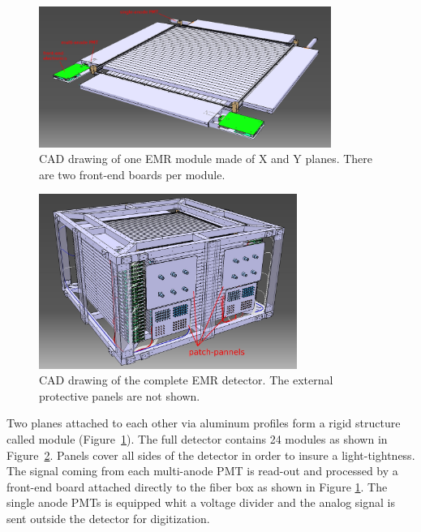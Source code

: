 \documentclass[a4paper,11pt]{article}
\begin{document}
\begin{figure}[htb]
 \centering
 \includegraphics[width=0.85\textwidth]{./emr_module}
 \caption[CAD drawing of one EMR module]{CAD drawing of one EMR module made of X and Y planes. There are two front-end boards per module.}
 \label{fig:emr_module}
\end{figure}
\begin{figure}[htp!]
 \centering
 \includegraphics[width=0.75\textwidth]{./emr_cad_model_1}
 \caption[CAD drawing of the EMR detector]{CAD drawing of the complete EMR detector. The external protective panels are not shown.}
 \label{fig:emr_full_cad_model}
\end{figure}

Two planes attached to each other via aluminum profiles form a rigid structure called module (Figure~\ref{fig:emr_module}). 
The full detector contains 24 modules as shown in Figure~\ref{fig:emr_full_cad_model}. Panels cover all sides of the detector
in order to insure a light-tightness. The signal coming from each multi-anode PMT is read-out and processed by a front-end board
attached directly to the fiber box as shown in Figure \ref{fig:emr_module}. The single anode PMTs is equipped whit a
voltage divider and the analog signal is sent outside the detector for digitization.
\end{document}
